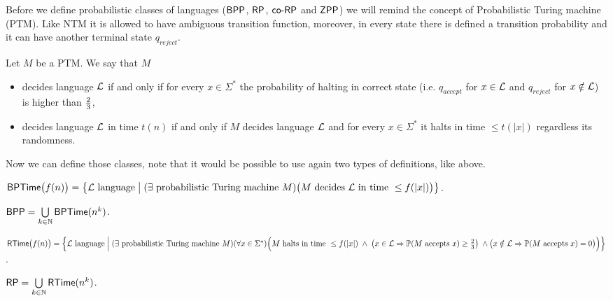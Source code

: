 		Before we define probabilistic classes of languages ($\mathsf{BPP}$, $\mathsf{RP}$, $\mathsf{co}\textnormal{-}\mathsf{RP}$ and $\mathsf{ZPP}$) we will remind the concept of Probabilistic Turing machine (PTM). Like NTM it is allowed to have ambiguous transition function, moreover, in every state there is defined a transition probability and it can have another terminal state $q_{reject}$.
		
		Let $M$ be a PTM. We say that $M$
		\begin{itemize}
			\item decides language $\cal L$ if and only if for every $x\in\Sigma^*$ the probability of halting in correct state (i.e. $q_{accept}$ for $x\in{\cal L}$ and $q_{reject}$ for $x\notin{\cal L}$) is higher than $\nicefrac{2}{3}$,
			\item decides language $\cal L$ in time $t(n)$ if and only if $M$ decides language $\cal L$ and for every $x\in\Sigma^*$ it halts in time $\leq t(|x|)$ regardless its randomness.
		\end{itemize}
		Now we can define those classes, note that it would be possible to use again two types of definitions, like above.
		
		
		\begin{defn}\label{def:BPTime}
			$\mathsf{BPTime}\bigl(f(n)\bigr) = \bigl\{ {\cal L}\textnormal{ language} \bigm| (\exists \textnormal{ probabilistic Turing machine }M)\\ \bigl(M\textnormal{ decides }{\cal L}\textnormal{ in time }\leq f(|x|)\bigr) \bigr\}$.
		\end{defn}
		
		\begin{defn}
			$\mathsf{BPP} = \bigcup\limits_{k\in\mathbb{N}} \mathsf{BPTime}(n^k)$.
		\end{defn}
		
		\begin{defn}
			$\RTime\bigl(f(n)\bigr) = \Bigl\{ {\cal L}\textnormal{ language} \Bigm| (\exists \textnormal{ probabilistic Turing machine }M)\\ (\forall x\in\Sigma^*)\Bigl(M \textnormal{ halts in time } \leq f(|x|) \;\wedge\; \bigl( x\in{\cal L} \then \prob(M\textnormal{ accepts }x) \geq \nicefrac{2}{3} \bigr) \;\wedge\\ \bigl( x\notin{\cal L} \then \prob(M\textnormal{ accepts }x) = 0 \bigr) \Bigr) \Bigr\}$.
		\end{defn}
		
		\begin{defn}
			$\mathsf{RP} = \bigcup\limits_{k\in\mathbb{N}} \mathsf{RTime}(n^k)$.
		\end{defn}
		
